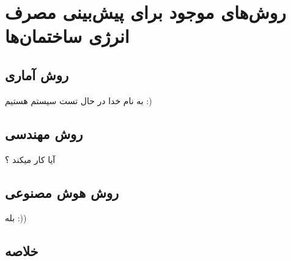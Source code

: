 \chapter{روش‌های موجود برای پیش‌بینی مصرف انرژی ساختمان‌ها}
\section{روش آماری}
به نام خدا در حال تست سیستم هستیم :)
\section{روش مهندسی}
آیا کار میکند ؟
\section{روش هوش مصنوعی}
بله :))
\section{خلاصه}